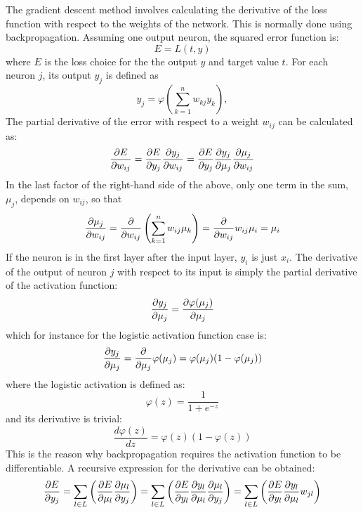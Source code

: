 The gradient descent method involves calculating the derivative of the loss function with respect to the weights of the network. This is normally done using backpropagation. Assuming one output neuron, the squared error function is:
\begin{equation}
    E = L(t, y)
\end{equation}
where $E$ is the loss choice for the the output $y$ and target value $t$.
For each neuron $j$, its output $y_j$ is defined as
\begin{equation}
    y_j = \varphi\left(\sum_{k=1}^n w_{kj}y_k\right),
\end{equation}
%
The partial derivative of the error with respect to a weight $w_{ij}$ can be calculated as:
\begin{equation}
    \pdv{E}{w_{ij}} = \pdv{E}{y_j}\pdv{y_j}{w_{ij}} = \pdv{E}{y_j}\pdv{y_j}{\mu_j}\pdv{\mu_j}{w_{ij}}
\end{equation}
%
In the last factor of the right-hand side of the above, only one term in the sum, $\mu_j$, depends on $w_{ij}$, so that
%
\begin{equation}
    \pdv{\mu_j}{w_{ij}} = \pdv{}{w_{ij}}\left( \sum_{k=1}^n w_{ij}\mu_k \right) = \pdv{}{w_{ij}}w_{ij}\mu_i = \mu_i
\end{equation}
%
If the neuron is in the first layer after the input layer, $y_i$ is just $x_i$.
The derivative of the output of neuron $j$ with respect to its input is simply the partial derivative of the activation function:
%
\begin{equation}
    \pdv{y_j}{\mu_j} = \pdv{\varphi(\mu_j)}{\mu_j}
\end{equation}
%
which for instance for the logistic activation function case is:
\begin{equation}
    \pdv{y_j}{\mu_j} = \pdv{}{\mu_j} \varphi(\mu_j) = \varphi(\mu_j)(1 - \varphi(\mu_j))
\end{equation}
where the logistic activation is defined as:
\begin{equation}
    \varphi(z) = \frac 1 {1+e^{-z}}
\end{equation}
and its derivative is trivial:
\begin{equation}
    \frac {d \varphi(z)}{d z} = \varphi(z)(1-\varphi(z)) 
\end{equation}
%
This is the reason why backpropagation requires the activation function to be differentiable.
A recursive expression for the derivative can be obtained:
\begin{equation}
    \pdv{E}{y_j} = \sum_{l \in L} \left( \pdv{E}{\mu_l} \pdv{\mu_l}{y_j} \right) 
    = \sum_{l \in L} \left( \pdv{E}{y_l} \pdv{y_l}{\mu_l} \pdv{\mu_l}{y_j} \right)
    = \sum_{l \in L} \left( \pdv{E}{y_l} \pdv{y_l}{\mu_l} w_{jl} \right)
\end{equation}
